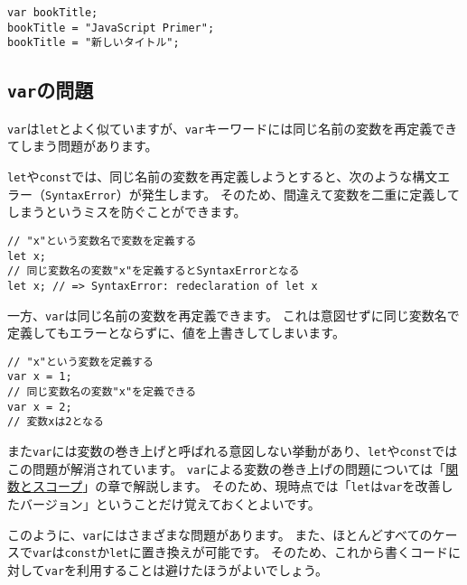 \begin{lstlisting}
var bookTitle;
bookTitle = "JavaScript Primer";
bookTitle = "新しいタイトル";
\end{lstlisting}

\hypertarget{var-issues}{%
\subsection{\texorpdfstring{\texttt{var}の問題}{varの問題}}\label{var-issues}}

\texttt{var}は\texttt{let}とよく似ていますが、\texttt{var}キーワードには同じ名前の変数を再定義できてしまう問題があります。

\texttt{let}や\texttt{const}では、同じ名前の変数を再定義しようとすると、次のような構文エラー（\texttt{SyntaxError}）が発生します。
そのため、間違えて変数を二重に定義してしまうというミスを防ぐことができます。

\begin{lstlisting}
// "x"という変数名で変数を定義する
let x;
// 同じ変数名の変数"x"を定義するとSyntaxErrorとなる
let x; // => SyntaxError: redeclaration of let x
\end{lstlisting}

一方、\texttt{var}は同じ名前の変数を再定義できます。
これは意図せずに同じ変数名で定義してもエラーとならずに、値を上書きしてしまいます。

\begin{lstlisting}
// "x"という変数を定義する
var x = 1;
// 同じ変数名の変数"x"を定義できる
var x = 2;
// 変数xは2となる
\end{lstlisting}

\enlargethispage{\baselineskip}また\texttt{var}には変数の巻き上げと呼ばれる意図しない挙動があり、\texttt{let}や\texttt{const}ではこの問題が解消されています。
\texttt{var}による変数の巻き上げの問題については「\hyperlink{function-and-scope}{関数とスコープ}」の章で解説します。
そのため、現時点では「\texttt{let}は\texttt{var}を改善したバージョン」ということだけ覚えておくとよいです。

このように、\texttt{var}にはさまざまな問題があります。
また、ほとんどすべてのケースで\texttt{var}は\texttt{const}か\texttt{let}に置き換えが可能です。
そのため、これから書くコードに対して\texttt{var}を利用することは避けたほうがよいでしょう。

